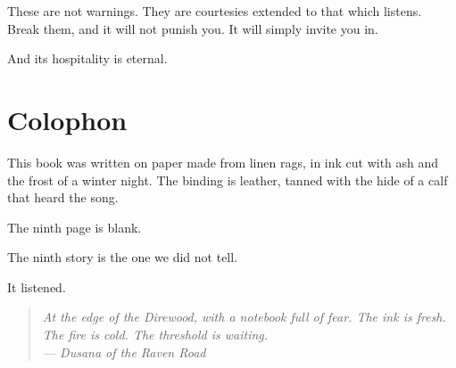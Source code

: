 \documentclass[10pt,twoside]{book}
\newcommand{\dusana}[1]{\begin{quote}\itshape #1 \\ --- Dusana of the Raven Road\end{quote}}
\begin{document}
These are not warnings. They are courtesies extended to that which listens. Break them, and it will not punish you. It will simply invite you in.

And its hospitality is eternal.

\chapter*{Colophon}

This book was written on paper made from linen rags, in ink cut with ash and the frost of a winter night. The binding is leather, tanned with the hide of a calf that heard the song.

The ninth page is blank.

The ninth story is the one we did not tell.

It listened.

\dusana{At the edge of the Direwood, with a notebook full of fear. The ink is fresh. The fire is cold. The threshold is waiting.}
\end{document}
